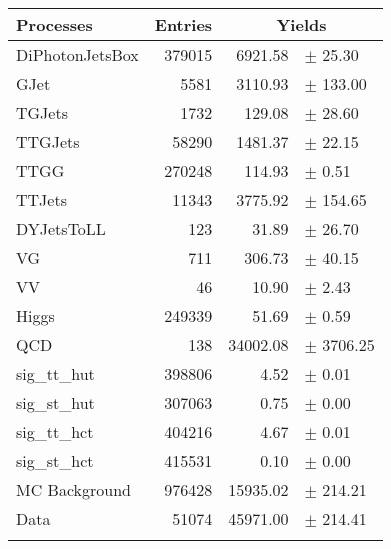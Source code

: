 {\renewcommand{\arraystretch}{1.0}
\begin{center}
\begin{tabular}{lrrl}
\hline\hline
Processes & Entries &\multicolumn{2}{c}{Yields}\\
\hline\hline
DiPhotonJetsBox  & 	          379015 & 	         6921.58 & $\pm$ 	      25.30\\
GJet		 & 	            5581 & 	         3110.93 & $\pm$ 	     133.00\\
TGJets		 & 	            1732 & 	          129.08 & $\pm$ 	      28.60\\
TTGJets		 & 	           58290 & 	         1481.37 & $\pm$ 	      22.15\\
TTGG		 & 	          270248 & 	          114.93 & $\pm$ 	       0.51\\
TTJets		 & 	           11343 & 	         3775.92 & $\pm$ 	     154.65\\
DYJetsToLL	 & 	             123 & 	           31.89 & $\pm$ 	      26.70\\
VG		 & 	             711 & 	          306.73 & $\pm$ 	      40.15\\
VV		 & 	              46 & 	           10.90 & $\pm$ 	       2.43\\
Higgs		 & 	          249339 & 	           51.69 & $\pm$ 	       0.59\\
QCD		 & 	             138 & 	        34002.08 & $\pm$ 	    3706.25\\
sig\_tt\_hut	 & 	          398806 & 	            4.52 & $\pm$ 	       0.01\\
sig\_st\_hut	 & 	          307063 & 	            0.75 & $\pm$ 	       0.00\\
sig\_tt\_hct	 & 	          404216 & 	            4.67 & $\pm$ 	       0.01\\
sig\_st\_hct	 & 	          415531 & 	            0.10 & $\pm$ 	       0.00\\
\hline
MC Background	 & 	          976428 & 	        15935.02 & $\pm$ 	     214.21\\
Data		 & 	           51074 & 	        45971.00 & $\pm$ 	     214.41\\
\hline\hline\\
\end{tabular}
\end{center}
}
